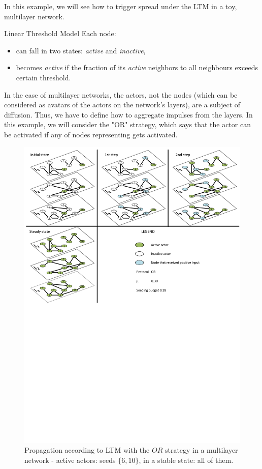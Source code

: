 \documentclass{beamer}
\begin{document}
\begin{frame}{\secname}
    In this example, we will see how to trigger spread under the LTM in a toy,
    multilayer network.
    \pause
    \begin{block}{Linear Threshold Model}
    Each node:
    \begin{itemize}
        \item can fall in two states: \textit{active} and \textit{inactive},
        \item becomes \textit{active} if the fraction of its \textit{active} neighbors to all neighbours
        exceeds certain threshold.
    \end{itemize}
    \end{block}
    \pause
    In the case of multilayer networks, the actors, not the nodes (which can be considered as
    avatars of the actors on the network's layers), are a subject of diffusion. Thus, we have to
    define how to aggregate impulses from the layers. In this example, we will consider the "OR" strategy,
    which says that the actor can be activated if any of nodes representing gets activated.
\end{frame}

\begin{frame}{\secname}
    \begin{figure}
        \centering
        \includegraphics[width=.75\textwidth]{figures/ltm_example_or.pdf}
        \caption{Propagation according to LTM with the $OR$ strategy in a multilayer network -
        active actors: seeds $\{6, 10\}$, in a stable state: all of them.}
    \end{figure}
\end{frame}
\end{document}
